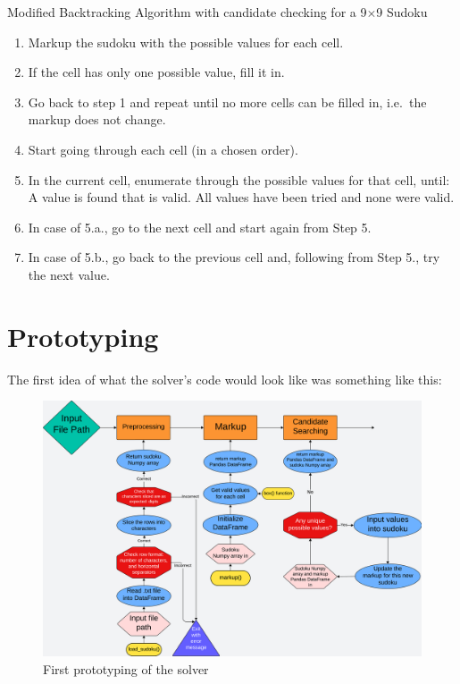 \documentclass[12pt]{report} %
\begin{document}
\begin{definitionbox}{Modified Backtracking Algorithm with candidate checking for a 9$\times$9 Sudoku}

  \begin{enumerate}
    \item Markup the sudoku with the possible values for each cell.
    \item If the cell has only one possible value, fill it in.
    \item Go back to step 1 and repeat until no more cells can be filled in, i.e.\ the markup does not change.
    \item Start going through each cell (in a chosen order).
    \item In the current cell, enumerate through the possible values for that cell, until:
     A value is found that is valid.
     All values have been tried and none were valid.
    \item In case of 5.a., go to the next cell and start again from Step 5.
    \item In case of 5.b., go back to the previous cell and, following from Step 5., try the next value.
  \end{enumerate}

\end{definitionbox}

\newpage
\section{Prototyping}


The first idea of what the solver's code would look like was something like this:

\begin{figure}[bthp]
  \centering
  \includegraphics[width=\textwidth]{prototyping1.png}
  \caption{First prototyping of the solver}
\end{figure}
\end{document}
